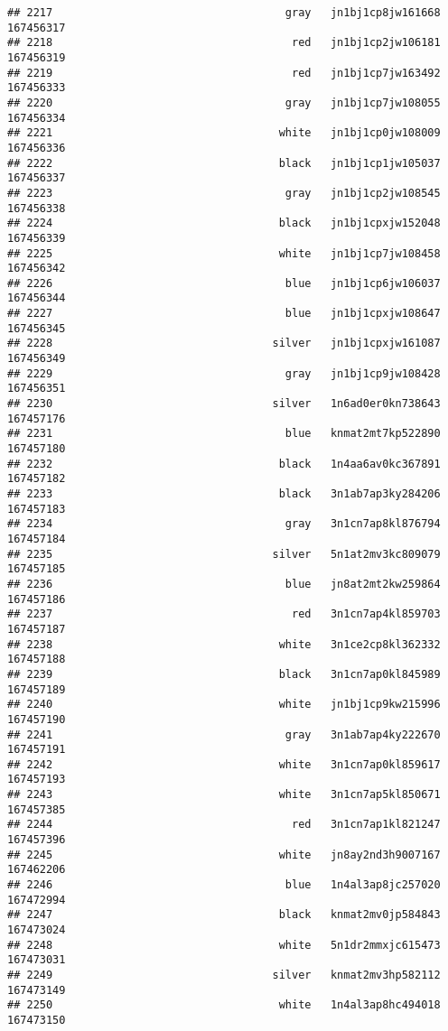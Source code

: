 \documentclass[
]{article}
\begin{document}
\begin{verbatim}
## 2217                                    gray   jn1bj1cp8jw161668 167456317
## 2218                                     red   jn1bj1cp2jw106181 167456319
## 2219                                     red   jn1bj1cp7jw163492 167456333
## 2220                                    gray   jn1bj1cp7jw108055 167456334
## 2221                                   white   jn1bj1cp0jw108009 167456336
## 2222                                   black   jn1bj1cp1jw105037 167456337
## 2223                                    gray   jn1bj1cp2jw108545 167456338
## 2224                                   black   jn1bj1cpxjw152048 167456339
## 2225                                   white   jn1bj1cp7jw108458 167456342
## 2226                                    blue   jn1bj1cp6jw106037 167456344
## 2227                                    blue   jn1bj1cpxjw108647 167456345
## 2228                                  silver   jn1bj1cpxjw161087 167456349
## 2229                                    gray   jn1bj1cp9jw108428 167456351
## 2230                                  silver   1n6ad0er0kn738643 167457176
## 2231                                    blue   knmat2mt7kp522890 167457180
## 2232                                   black   1n4aa6av0kc367891 167457182
## 2233                                   black   3n1ab7ap3ky284206 167457183
## 2234                                    gray   3n1cn7ap8kl876794 167457184
## 2235                                  silver   5n1at2mv3kc809079 167457185
## 2236                                    blue   jn8at2mt2kw259864 167457186
## 2237                                     red   3n1cn7ap4kl859703 167457187
## 2238                                   white   3n1ce2cp8kl362332 167457188
## 2239                                   black   3n1cn7ap0kl845989 167457189
## 2240                                   white   jn1bj1cp9kw215996 167457190
## 2241                                    gray   3n1ab7ap4ky222670 167457191
## 2242                                   white   3n1cn7ap0kl859617 167457193
## 2243                                   white   3n1cn7ap5kl850671 167457385
## 2244                                     red   3n1cn7ap1kl821247 167457396
## 2245                                   white   jn8ay2nd3h9007167 167462206
## 2246                                    blue   1n4al3ap8jc257020 167472994
## 2247                                   black   knmat2mv0jp584843 167473024
## 2248                                   white   5n1dr2mmxjc615473 167473031
## 2249                                  silver   knmat2mv3hp582112 167473149
## 2250                                   white   1n4al3ap8hc494018 167473150

\end{verbatim}
\end{document}
